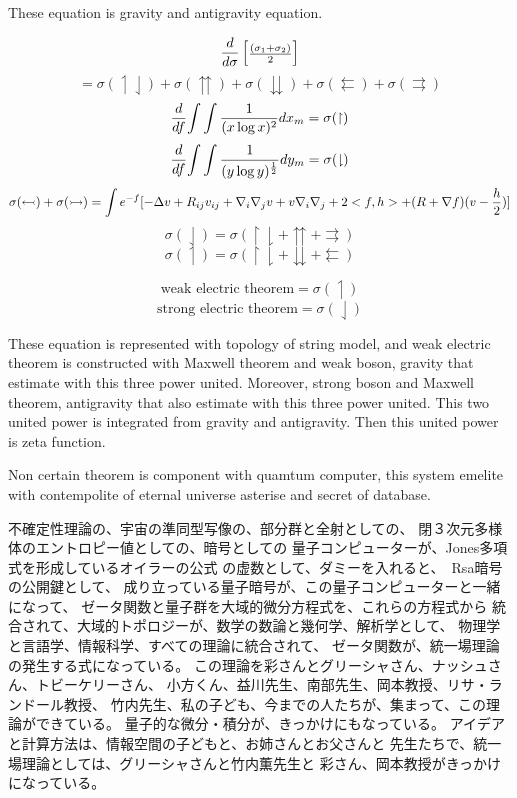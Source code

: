 \documentclass{jsarticle}
\begin{document}
  These equation is gravity and antigravity equation. 

	   $$ {d \over d\sigma}\begin{bmatrix}{(\sigma_1 + \sigma_2) 
	   \over 2}\end{bmatrix}  $$
	   $$ = \sigma(\upharpoonleft \downharpoonleft) + \sigma(
	   \upuparrows)+ \sigma(\downdownarrows)+ 
	   \sigma(\leftleftarrows)
	   + \sigma(\rightrightarrows) $$
	   $$ {d \over df}{\int \int {1 \over (x \log x)^2}}dx_m
	   = \sigma(\upharpoonright) $$
	   $$ {d \over df}{\int \int {1 \over (y \log y)^{1 \over2}}}dy_m
	   = \sigma(\downharpoonright) $$
	   $$ \sigma(\leftarrowtail) + \sigma(\rightarrowtail)
	   = \int e^{-f}[-\Delta v + R_{ij}v_{ij} + \nabla_{i}\nabla_{j}v
	   + v\nabla_{i}\nabla_{j} + 2 <f,h> + (R + \nabla f)(v - 
	   {h \over 2})]
	   $$
	   $$ \sigma(\downharpoonleft) = \sigma(\upharpoonright 
	   \downharpoonright + \upuparrows 
	   + \rightrightarrows)$$
	   $$ \sigma(\upharpoonleft) =  \sigma(\upharpoonright 
	   \downharpoonright + \downdownarrows 
	   + \leftleftarrows) $$
         
	   $$ \text{weak electric theorem} = \sigma(\upharpoonleft) $$
	   $$ \text{strong electric theorem} = \sigma(\downharpoonleft) $$

	   These equation is represented with topology of string model,
	   and weak electric theorem is constructed with Maxwell theorem 
	   and weak boson, gravity that estimate with this three power united.
	   Moreover, strong boson and Maxwell theorem, antigravity that
	   also estimate with this three power united.
	   This two united power is integrated from gravity and antigravity.
	   Then this united power is zeta function.


      Non certain theorem is component with quamtum computer, this system
   emelite with contempolite of eternal universe asterise and
   secret of database.

   不確定性理論の、宇宙の準同型写像の、部分群と全射としての、
   閉３次元多様体のエントロピー値としての、暗号としての
   量子コンピューターが、Jones多項式を形成しているオイラーの公式
   の虚数として、ダミーを入れると、　Rsa暗号の公開鍵として、
   成り立っている量子暗号が、この量子コンピューターと一緒になって、
   ゼータ関数と量子群を大域的微分方程式を、これらの方程式から
   統合されて、大域的トポロジーが、数学の数論と幾何学、解析学として、
   物理学と言語学、情報科学、すべての理論に統合されて、
   ゼータ関数が、統一場理論の発生する式になっている。
   この理論を彩さんとグリーシャさん、ナッシュさん、トビーケリーさん、
   小方くん、益川先生、南部先生、岡本教授、リサ・ランドール教授、
   竹内先生、私の子ども、今までの人たちが、集まって、この理論ができている。
   量子的な微分・積分が、きっかけにもなっている。
   アイデアと計算方法は、情報空間の子どもと、お姉さんとお父さんと
   先生たちで、統一場理論としては、グリーシャさんと竹内薫先生と
   彩さん、岡本教授がきっかけになっている。
\end{document}
